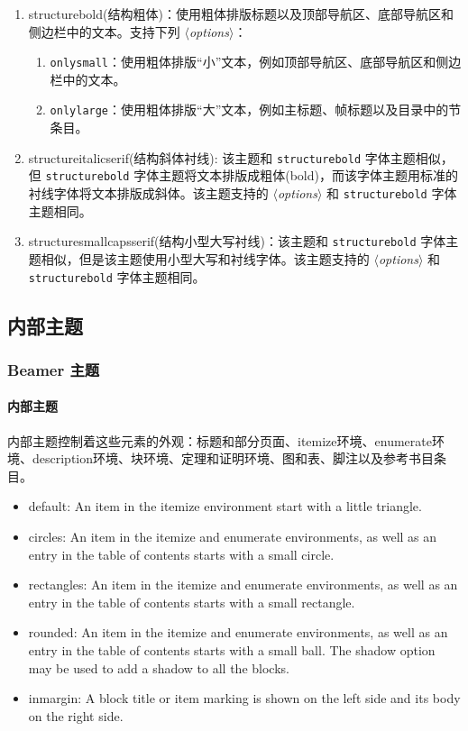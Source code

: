 \documentclass{beamer}
\newcommand\m[1]{\mbox{$\langle${\rmfamily\textit{#1}\/}$\rangle$}}
\begin{document}
\begin{frame}
\begin{enumerate}[I]
\item structurebold(结构粗体)：使用粗体排版标题以及顶部导航区、底部导航区和侧边栏中的文本。支持下列 \m{options}：
\begin{enumerate}
	\item \verb|onlysmall|：使用粗体排版“小”文本，例如顶部导航区、底部导航区和侧边栏中的文本。
	\item \verb|onlylarge|：使用粗体排版“大”文本，例如主标题、帧标题以及目录中的节条目。
\end{enumerate}
\item structureitalicserif(结构斜体衬线): %
该主题和 \verb|structurebold| 字体主题相似，但 \verb|structurebold| 字体主题将文本排版成粗体(bold)，而该字体主题用标准的衬线字体将文本排版成斜体。该主题支持的 \m{options} 和 \verb|structurebold| 字体主题相同。
\item structuresmallcapsserif(结构小型大写衬线)：该主题和 \verb|structurebold| 字体主题相似，但是该主题使用小型大写和衬线字体。该主题支持的 \m{options} 和 \verb|structurebold| 字体主题相同。
\end{enumerate}
\end{frame}

\subsection{内部主题}
\begin{frame}
\frametitle{Beamer 主题}
\framesubtitle{内部主题}
内部主题控制着这些元素的外观：标题和部分页面、itemize环境、enumerate环境、description环境、块环境、定理和证明环境、图和表、脚注以及参考书目条目。
\begin{itemize}
\item default: An item in the itemize environment start with a little triangle.
\item circles: An item in the itemize and enumerate environments, as well as an entry in the table of contents starts with a small circle.
\item rectangles: An item in the itemize and enumerate environments, as well as an entry in the table of contents starts with a small rectangle.
\item rounded: An item in the itemize and enumerate environments, as well as an entry in the table of contents starts with a small ball. The shadow option may be used to add a shadow to all the blocks.
\item inmargin: A block title or item marking is shown on the left side and its body on the right side.
\end{itemize}
\end{frame}
\end{document}
